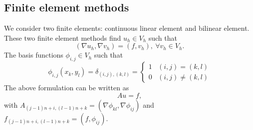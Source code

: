 \subsection{Finite element methods}
We consider two finite elements: continuous linear element and bilinear element. These two finite element methods find $u_h\in V_h$ such that
$$
(\nabla u_h, \nabla v_h)=(f, v_h),\ \forall v_h\in V_h.
$$
The basis functions $\phi_{i,j}\in V_h$ such that 
\begin{equation*}
\phi_{i,j}(x_k,y_l)=\delta_{(i,j), (k,l)}=
\left\{
\begin{array}{rl}
1& (i,j)= (k,l)\\
0& (i,j)\neq (k,l)
\end{array}
\right.
\end{equation*}
The above formulation can be written as 
$$
Au=f,
$$
with $A_{(j-1)n+i, (l-1)n+k}=(\nabla \phi_{kl}, \nabla \phi_{ij})$ and $f_{(j-1)n+i, (l-1)n+k}=(f, \phi_{ij})$.
